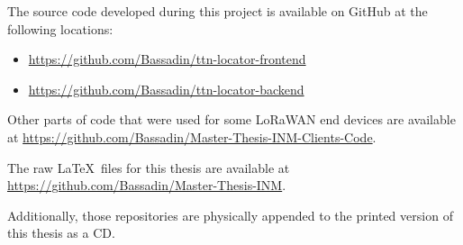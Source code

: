 
The source code developed during this project is available on GitHub at the following locations:

\begin{itemize}
    \item \url{https://github.com/Bassadin/ttn-locator-frontend}
    \item \url{https://github.com/Bassadin/ttn-locator-backend}
\end{itemize}

Other parts of code that were used for some \ac{LoRaWAN} end devices are available at \url{https://github.com/Bassadin/Master-Thesis-INM-Clients-Code}.

The raw \LaTeX~files for this thesis are available at \url{https://github.com/Bassadin/Master-Thesis-INM}.

Additionally, those repositories are physically appended to the printed version of this thesis as a CD.